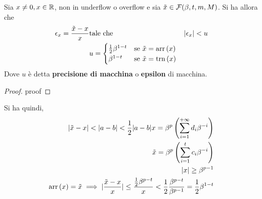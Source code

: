 \begin{thm}
    Sia $x \neq 0, x \in \mathbb{R}$, non in underflow o overflow e sia
    $\tilde{x} \in \mathcal{F}(\beta, t, m, M)$. Si ha allora che
    \begin{eqnarray*}
        \epsilon_x = \dfrac{\tilde{x} - x}{x} & \text{tale che} & \lvert\epsilon_x\rvert < u \\
        & u = \begin{cases}
            \frac{1}{2} \beta^{1-t} & \text{se } \tilde{x} = \text{arr}\left(x\right) \\
            \beta^{1-t} & \text{se } \tilde{x} = \text{trn}\left(x\right) \\
        \end{cases}
    \end{eqnarray*}
    Dove $u$ è detta \textbf{precisione di macchina} o \textbf{epsilon} di macchina.
\end{thm}


    \begin{proof}
        proof
    \end{proof}

    Si ha quindi,
    \begin{eqnarray*}
        \lvert\tilde{x} - x\rvert < \lvert a -b \rvert < \frac{1}{2} \lvert a - b\rvert
        x = \beta^p\left(\sum_{i=1}^{+\infty} d_i \beta^{-i}\right) \\
        \tilde{x} = \beta^p \left( \sum_{i=1}^{t} c_i \beta^{-i} \right) \\
        \lvert x\rvert \geq \beta^{p-1} \\
        \text{arr}\left(x\right) = \tilde{x} \implies \lvert\dfrac{\tilde{x} - x}{x}\rvert \leq \dfrac{\frac{1}{2} \beta^{p - t}}{x} < \frac{1}{2} \dfrac{\beta^{p-t}}{\beta^{p-1}} = \frac{1}{2} \beta^{1-t} \\
    \end{eqnarray*}


